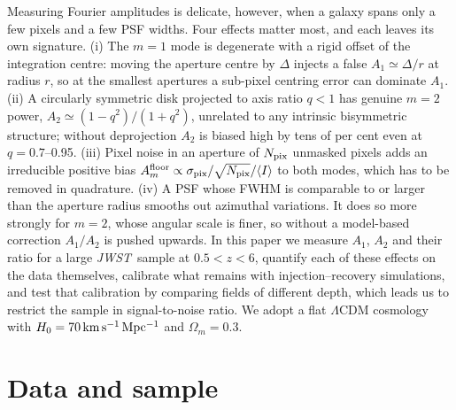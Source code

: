 \documentclass[fleqn,usenatbib]{mnras}
\newcommand{\JWST}{\textit{JWST}}
\begin{document}
Measuring Fourier amplitudes is delicate, however, when a galaxy spans only a
few pixels and a few PSF widths. Four effects matter most, and each leaves its
own signature. (i) The $m=1$ mode is degenerate with a rigid offset of the
integration centre: moving the aperture centre by $\Delta$ injects a false
$A_1\simeq\Delta/r$ at radius $r$, so at the smallest apertures a sub-pixel
centring error can dominate $A_1$. (ii) A circularly symmetric disk projected to
axis ratio $q<1$ has genuine $m=2$ power, $A_2\simeq(1-q^2)/(1+q^2)$, unrelated
to any intrinsic bisymmetric structure; without deprojection $A_2$ is biased
high by tens of per cent even at $q=0.7$--0.95. (iii) Pixel noise in an aperture
of $N_{\rm pix}$ unmasked pixels adds an irreducible positive bias
$A_m^{\rm floor}\propto\sigma_{\rm pix}/\sqrt{N_{\rm pix}}/\langle I\rangle$ to
both modes, which has to be removed in quadrature. (iv) A PSF whose FWHM is
comparable to or larger than the aperture radius smooths out azimuthal
variations. It does so more strongly for $m=2$, whose angular scale is finer, so
without a model-based correction $A_1/A_2$ is pushed upwards. In this paper we
measure $A_1$, $A_2$ and their ratio for a large \JWST\ sample at $0.5<z<6$,
quantify each of these effects on the data themselves, calibrate what
remains with injection--recovery simulations, and test that calibration by
comparing fields of different depth, which leads us to restrict the sample in
signal-to-noise ratio. We adopt a flat $\Lambda$CDM
cosmology with $H_0=70\,{\rm km\,s^{-1}\,Mpc^{-1}}$ and $\Omega_m=0.3$.

\section{Data and sample}\label{sec:data}
\end{document}

